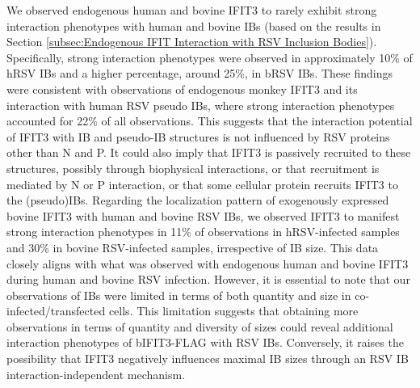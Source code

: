 We observed endogenous human and bovine IFIT3 to rarely exhibit strong interaction phenotypes with human and bovine IBs (based on the results in Section \ref{subsec:Endogenous IFIT Interaction with RSV Inclusion Bodies}). Specifically, strong interaction phenotypes were observed in approximately 10\% of hRSV IBs and a higher percentage, around 25\%, in bRSV IBs. These findings were consistent with observations of endogenous monkey IFIT3 and its interaction with human RSV pseudo IBs, where strong interaction phenotypes accounted for 22\% of all observations. This suggests that the interaction potential of IFIT3 with IB and pseudo-IB structures is not influenced by RSV proteins other than N and P. It could also imply that IFIT3 is passively recruited to these structures, possibly through biophysical interactions, or that recruitment is mediated by N or P interaction, or that some cellular protein recruits IFIT3 to the (pseudo)IBs. Regarding the localization pattern of exogenously expressed bovine IFIT3 with human and bovine RSV IBs, we observed IFIT3 to manifest strong interaction phenotypes in 11\% of observations in hRSV-infected samples and 30\% in bovine RSV-infected samples, irrespective of IB size. This data closely aligns with what was observed with endogenous human and bovine IFIT3 during human and bovine RSV infection. However, it is essential to note that our observations of IBs were limited in terms of both quantity and size in co-infected/transfected cells. This limitation suggests that obtaining more observations in terms of quantity and diversity of sizes could reveal additional interaction phenotypes of bIFIT3-FLAG with RSV IBs. Conversely, it raises the possibility that IFIT3 negatively influences maximal IB sizes through an RSV IB interaction-independent mechanism.

